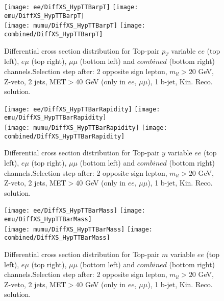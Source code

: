\clearpage
\newpage





\begin{figure}
  \texttt{[image: ee/DiffXS\_HypTTBarpT]}
  \texttt{[image: emu/DiffXS\_HypTTBarpT]}\\
  \texttt{[image: mumu/DiffXS\_HypTTBarpT]}
  \texttt{[image: combined/DiffXS\_HypTTBarpT]}
\caption{Differential cross section distribution for  Top-pair $p_T$ variable  $ee$ (top left), $e\mu$ (top right), $\mu\mu$ (bottom left) and $combined$ (bottom right) channels.\newline Selection step after: 2 opposite sign lepton, $m_{ll}>20$ GeV, Z-veto, 2 jets, MET$>40$ GeV (only in $ee$, $\mu\mu$), 1 b-jet, Kin. Reco. solution.}
\end{figure}

\clearpage
\newpage

\begin{figure}
  \texttt{[image: ee/DiffXS\_HypTTBarRapidity]}
  \texttt{[image: emu/DiffXS\_HypTTBarRapidity]}\\
  \texttt{[image: mumu/DiffXS\_HypTTBarRapidity]}
  \texttt{[image: combined/DiffXS\_HypTTBarRapidity]}
\caption{Differential cross section distribution for  Top-pair $y$ variable  $ee$ (top left), $e\mu$ (top right), $\mu\mu$ (bottom left) and $combined$ (bottom right) channels.\newline Selection step after: 2 opposite sign lepton, $m_{ll}>20$ GeV, Z-veto, 2 jets, MET$>40$ GeV (only in $ee$, $\mu\mu$), 1 b-jet, Kin. Reco. solution.}
\end{figure}

\clearpage
\newpage


\begin{figure}
  \texttt{[image: ee/DiffXS\_HypTTBarMass]}
  \texttt{[image: emu/DiffXS\_HypTTBarMass]}\\
  \texttt{[image: mumu/DiffXS\_HypTTBarMass]}
  \texttt{[image: combined/DiffXS\_HypTTBarMass]}
\caption{Differential cross section distribution for  Top-pair $m$ variable  $ee$ (top left), $e\mu$ (top right), $\mu\mu$ (bottom left) and $combined$ (bottom right) channels.\newline Selection step after: 2 opposite sign lepton, $m_{ll}>20$ GeV, Z-veto, 2 jets, MET$>40$ GeV (only in $ee$, $\mu\mu$), 1 b-jet, Kin. Reco. solution.}
\end{figure}

